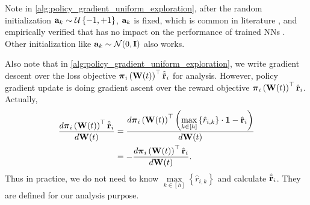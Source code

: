 Note in \cref{alg:policy_gradient_uniform_exploration}, after the random initialization ${\mathbf{a}}_k \sim {\mathcal{U}}\left\{-1, +1\right\}$, ${\mathbf{a}}_k$ is fixed, which is common in literature \citep{li2018learning,du2018gradientA,du2018gradientB,allen2018convergenceA,allen2018convergenceB}, and empirically verified that has no impact on the performance of trained NNs \citep{hoffer2018fix}. Other initialization like ${\mathbf{a}}_k \sim {\mathcal{N}}(0, {\mathbf{I}})$ also works.

Also note that in \cref{alg:policy_gradient_uniform_exploration}, we write gradient descent over the loss objective  ${\boldsymbol{\pi}}_{i}\left({\mathbf{W}}(t)\right)^\top \hat{{\tilde{\mathbf{r}}}}_i$ for analysis. However, policy gradient update is doing gradient ascent over the reward objective ${\boldsymbol{\pi}}_{i}\left({\mathbf{W}}(t)\right)^\top {\hat{\mathbf{r}}}_i$. Actually,
\begin{equation*}
\begin{split}
    \frac{d{\boldsymbol{\pi}}_{i}\left({\mathbf{W}}(t)\right)^\top \hat{{\tilde{\mathbf{r}}}}_i}{d {\mathbf{W}}(t)} &= \frac{d{\boldsymbol{\pi}}_{i}\left({\mathbf{W}}(t)\right)^\top \left( \max\limits_{k \in [h]}{\left\{ \hat{r}_{i, k} \right\}} \cdot {\mathbf{1}} - {\hat{\mathbf{r}}}_i \right)}{d {\mathbf{W}}(t)} \\
    &= - \frac{d{\boldsymbol{\pi}}_{i}\left({\mathbf{W}}(t)\right)^\top {\hat{\mathbf{r}}}_i}{d {\mathbf{W}}(t)}.
\end{split}
\end{equation*}
Thus in practice, we do not need to know $\max\limits_{k \in [h]}{\left\{ \hat{r}_{i, k} \right\}}$ and calculate $\hat{{\tilde{\mathbf{r}}}}_i$. They are defined for our analysis purpose.